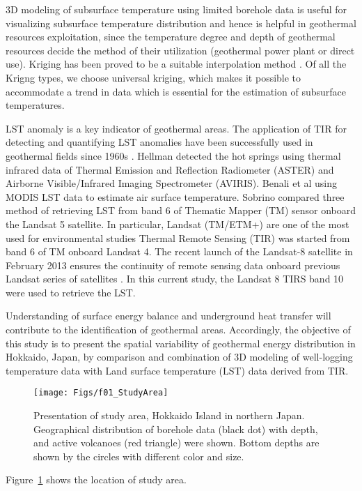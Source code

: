 3D modeling of subsurface temperature using limited borehole data is useful for visualizing subsurface temperature distribution and hence is helpful in geothermal resources exploitation, since the temperature degree and depth of geothermal resources decide the method of their utilization (geothermal power plant or direct use). Kriging has been proved to be a suitable interpolation method \cite{Agemar2012} . Of all the Krigng types, we choose universal kriging, which makes it possible to accommodate a trend in data which is essential for the estimation of subsurface temperatures. 

LST anomaly is a key indicator of geothermal areas. The application of TIR for detecting and quantifying LST anomalies have been successfully used in geothermal fields since 1960s \cite{Qin2011}. Hellman \cite{Hellman2004} detected the hot springs using thermal infrared data of Thermal Emission and Reflection Radiometer (ASTER) and Airborne Visible/Infrared Imaging Spectrometer (AVIRIS). Benali et al \cite{Benali2012} using MODIS LST data to estimate air surface temperature. Sobrino \cite{Sobrino2004} compared three method of retrieving LST from band 6 of Thematic Mapper (TM) sensor onboard the Landsat 5 satellite. In particular, Landsat (TM/ETM+) are one of the most used for environmental studies \cite{Andres1995, Flynn2001, Harris1999, Wang2013}  Thermal Remote Sensing (TIR) was started from band 6 of TM onboard Landsat 4. The recent launch of the Landsat-8 satellite in February 2013 ensures the continuity of remote sensing data onboard previous Landsat series of satellites \cite{Jimenez-munoz2014}. In this current study, the Landsat 8 TIRS band 10 were used to retrieve the LST.

Understanding of surface energy balance and underground heat transfer will contribute to the identification of geothermal areas. Accordingly, the objective of this study is to present the spatial variability of geothermal energy distribution in Hokkaido, Japan, by comparison and combination of 3D modeling of well-logging temperature data with Land surface temperature (LST) data derived from TIR.

\begin{figure} [ht!]
    \texttt{[image: Figs/f01\_StudyArea]}
  \caption{Presentation of study area, Hokkaido Island in northern Japan. Geographical distribution of borehole data (black dot) with depth, and active volcanoes (red triangle) were shown. Bottom depths are shown by the circles with different color and size.}
  \label{fig:hkd}
\end{figure}
Figure~\ref{fig:hkd} shows the location of study area.


